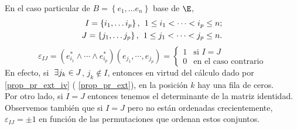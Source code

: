 \begin{obs}
    \label{obs_2_pr_ext} En el caso particular de $ B=\left\{ e_1, \dots
    e_n \right\} $ base de $ \E $,
    \[
        \begin{aligned}
            I=\left\{ i_1, \dots i_p \right\}, \hspace{0.15cm} 1 \leq i_1
            < \dots < i_p \leq n ; \\
            J=\left\{ j_1, \dots j_p \right\}, \hspace{0.15cm} 1 \leq j_1
            < \dots < j_p \leq n .
        \end{aligned}
    \]
    \[
        \varepsilon _{IJ} = \left( e_{i_1}^* \wedge \cdots \wedge e_{i_p}^*
        \right) \left( e_{j_1}, \cdots , e_{j_p} \right)= \left\{%
        \begin{array}{ll}
            1 & \text{si } I=J \\
            0 & \text{en el caso contrario}
        \end{array}
        \right.
    \]
    En efecto, si $ \hspace{0,1cm}\exists j_k \in J $, $ j_k \notin I $,
    entonces en virtud del cálculo dado por%
    \ref{prop_pr_ext_iv} (%
    \ref{prop_pr_ext}), en la posición $ k $ hay una fila de ceros.  \\
    Por otro lado, si $ I=J $ entonces tenemos el determinante de la
    matriz identidad.  \\
    Observemos también que si $ I=J $ pero no están ordenadas
    crecientemente, $ \varepsilon _{IJ}=\pm1 $ en función de las
    permutaciones que ordenan estos conjuntos.
\end{obs}

